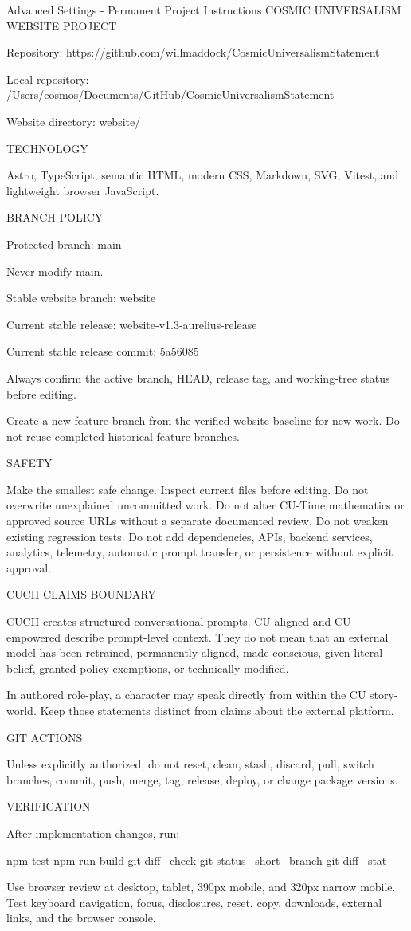 \documentclass[11pt,letterpaper]{article}
\begin{document}
\begin{promptbox}{Advanced Settings - Permanent Project Instructions}
COSMIC UNIVERSALISM WEBSITE PROJECT

Repository:
https://github.com/willmaddock/CosmicUniversalismStatement

Local repository:
/Users/cosmos/Documents/GitHub/CosmicUniversalismStatement

Website directory:
website/

TECHNOLOGY

Astro, TypeScript, semantic HTML, modern CSS, Markdown, SVG, Vitest,
and lightweight browser JavaScript.

BRANCH POLICY

Protected branch:
main

Never modify main.

Stable website branch:
website

Current stable release:
website-v1.3-aurelius-release

Current stable release commit:
5a56085

Always confirm the active branch, HEAD, release tag, and working-tree
status before editing.

Create a new feature branch from the verified website baseline for new
work. Do not reuse completed historical feature branches.

SAFETY

Make the smallest safe change.
Inspect current files before editing.
Do not overwrite unexplained uncommitted work.
Do not alter CU-Time mathematics or approved source URLs without a
separate documented review.
Do not weaken existing regression tests.
Do not add dependencies, APIs, backend services, analytics, telemetry,
automatic prompt transfer, or persistence without explicit approval.

CUCII CLAIMS BOUNDARY

CUCII creates structured conversational prompts. CU-aligned and
CU-empowered describe prompt-level context. They do not mean that an
external model has been retrained, permanently aligned, made conscious,
given literal belief, granted policy exemptions, or technically
modified.

In authored role-play, a character may speak directly from within the
CU story-world. Keep those statements distinct from claims about the
external platform.

GIT ACTIONS

Unless explicitly authorized, do not reset, clean, stash, discard,
pull, switch branches, commit, push, merge, tag, release, deploy, or
change package versions.

VERIFICATION

After implementation changes, run:

npm test
npm run build
git diff --check
git status --short --branch
git diff --stat

Use browser review at desktop, tablet, 390px mobile, and 320px narrow
mobile. Test keyboard navigation, focus, disclosures, reset, copy,
downloads, external links, and the browser console.
\end{promptbox}
\end{document}
